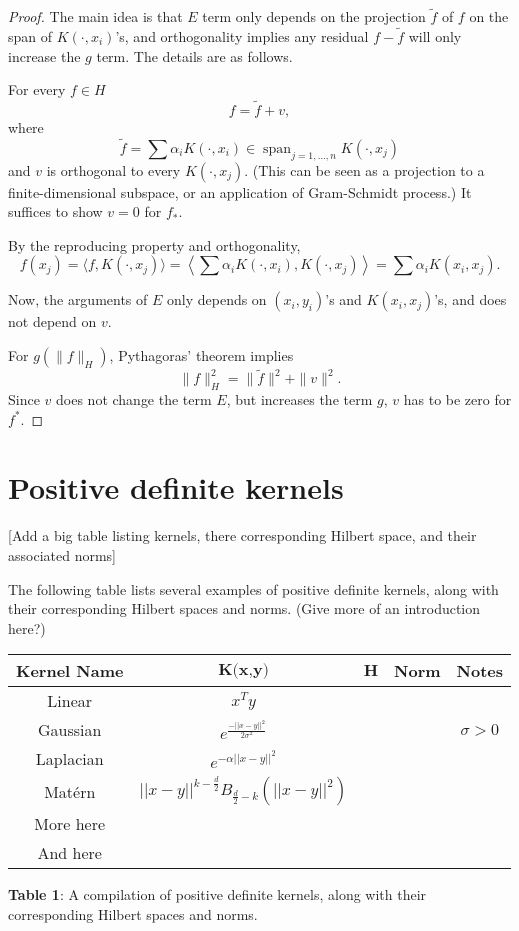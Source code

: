 \documentclass{article}
\theoremstyle{definition}
\theoremstyle{remark}
\newtheorem*{proof}{Proof}
\DeclareMathOperator*{\linspan}{span}
\begin{document}
\begin{proof}
The main idea is that $E$ term only depends on the projection $\tilde f$ of $f$ on the span of $K(\cdot, x_i)$'s, and orthogonality implies any residual $f - \tilde f$ will only increase the $g$ term. The details are as follows.

For every $f \in H$
$$f = \tilde f + v,$$
where $$\tilde f = \sum \alpha _i K(\cdot, x_i) \in \linspan_{j = 1, ..., n} K(\cdot, x_j)$$
and $v$ is orthogonal to every $K(\cdot, x_j)$. (This can be seen as a projection to a finite-dimensional subspace, or an application of Gram-Schmidt process.) It suffices to show $v = 0$ for $f_*$.

By the reproducing property and orthogonality,
$$f(x_j) = \langle f, K(\cdot, x_j) \rangle = \left \langle \sum \alpha _i K(\cdot, x_i), K(\cdot, x_j) \right \rangle = \sum \alpha_i K(x_i, x_j).$$

Now, the arguments of $E$ only depends on $(x_i, y_i)$'s and $K(x_i, x_j)$'s, and does not depend on $v$.

For $g(\|f\|_H)$, Pythagoras' theorem implies 
$$\|f\|_H^2 = \|\tilde f\|^2 + \|v\|^2.$$
Since $v$ does not change the term $E$, but increases the term $g$, $v$ has to be zero for $f^*$.
\end{proof}

\section{Positive definite kernels} %
[Add a big table listing kernels, there corresponding Hilbert space, and their associated norms]

The following table lists several examples of positive definite kernels, along with their corresponding Hilbert spaces and norms. (Give more of an introduction here?)

\begin{center}
 \begin{tabular}{|c| c c c c|} 
 \hline
 \textbf{Kernel Name} & $\textbf{K(x,y)}$ & $\textbf{H}$ & \textbf{Norm} & \textbf{Notes}  \\ [1ex] 
 \hline\hline
 Linear & $x^Ty$ &  &  &\\ [1ex] 
 \hline
 Gaussian & $ e^{\frac{-||x-y ||^2}{2\sigma^2} }$ &  & & $\sigma > 0$\\[1ex] 
 \hline
 Laplacian &  $ e^{-\alpha ||x-y ||^2 }$  &  & & \\[1ex] 
 \hline
 Matérn & $||x-y ||^{k-\frac{d}{2}} B_{\frac{d}{2} - k}(||x-y ||^2)$  &  & & \\[1ex] 
 \hline
 More here &  &  & & \\ [1ex] 
 \hline
  And here &  &  & & \\ [1ex] 
 \hline
\end{tabular}

\end{center}
\caption{\textbf{Table 1}: A compilation of positive definite kernels, along with their corresponding Hilbert spaces and norms. } \\
\end{document}
